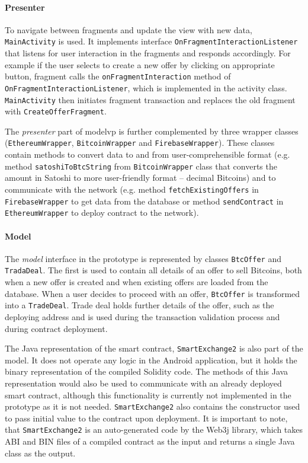 \paragraph{Presenter} 
\begin{sloppypar}
To navigate between fragments and update the view with new data, \texttt{MainActivity} is used. It implements interface \texttt{OnFragmentInteractionListener} that listens for user interaction in the fragments and responds accordingly. For example if the user selects to create a new offer by clicking on appropriate button, fragment calls the \texttt{onFragmentInteraction} method of \texttt{OnFragmentInteractionListener}, which is implemented in the activity class. \texttt{MainActivity} then initiates fragment transaction and replaces the old fragment with \texttt{CreateOfferFragment}.

The \textit{presenter} part of \acrshort{modelvp} is further complemented by three wrapper classes (\texttt{EthereumWrapper}, \texttt{BitcoinWrapper} and \texttt{FirebaseWrapper}). These classes contain methods to convert data to and from user-comprehensible format (e.g. method \texttt{satoshiToBtcString} from \texttt{BitcoinWrapper} class that converts the amount in Satoshi to more user-friendly format -- decimal Bitcoins) and to communicate with the network (e.g. method \texttt{fetchExistingOffers} in \texttt{FirebaseWrapper} to get data from the database or method \texttt{sendContract} in \texttt{EthereumWrapper} to deploy contract to the network).
\end{sloppypar}

\paragraph{Model}
The \textit{model} interface in the prototype is represented by classes \texttt{BtcOffer} and \texttt{TradaDeal}. The first is used to contain all details of an offer to sell Bitcoins, both when a new offer is created and when existing offers are loaded from the database. When a user decides to proceed with an offer, \texttt{BtcOffer} is transformed into a \texttt{TradeDeal}. Trade deal holds further details of the offer, such as the deploying address and is used during the transaction validation process and during contract deployment.

The Java representation of the smart contract, \texttt{SmartExchange2} is also part of the model. It does not operate any logic in the Android application, but it holds the binary representation of the compiled Solidity code. The methods of this Java representation would also be used to communicate with an already deployed smart contract, although this functionality is currently not implemented in the prototype as it is not needed. \texttt{SmartExchange2} also contains the constructor used to pass initial value to the contract upon deployment. It is important to note, that \texttt{SmartExchange2} is an auto-generated code by the Web3j library, which takes ABI and BIN files of a compiled contract as the input and returns a single Java class as the output.

